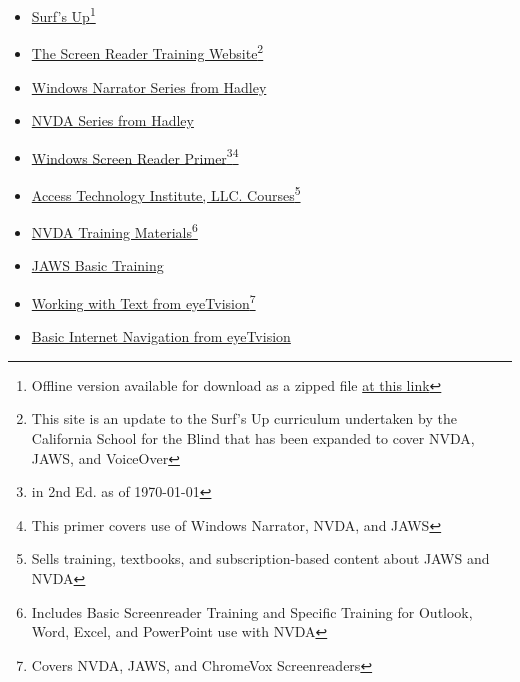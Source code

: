 \begin{itemize}[leftmargin=*]
	\item \href{https://www.freedomscientific.com/SurfsUp/}{Surf's Up}\footnote{\raggedright Offline version available for download as a zipped file \href{https://support.freedomscientific.com/SurfsUp/ZIP\_Surfs\_Up.zip}{at this link}}
	\item \href{https://srt.csb-cde.ca.gov/}{The Screen Reader Training Website}\footnote{\raggedright This site is an update to the Surf's Up curriculum undertaken by the California School for the Blind that has been expanded to cover NVDA, JAWS, and VoiceOver}
	\item \href{https://hadley.edu/workshops/windows-narrator-series}{Windows Narrator Series from Hadley}
	\item \href{https://hadley.edu/workshops/nvda-screen-reader-series}{NVDA Series from Hadley}
	\item \href{https://carroll.org/the-windows-screen-reader-primer-all-the-basics-and-more-second-edition/}{Windows Screen Reader Primer}\footnote{\raggedright in 2nd Ed. as of \today}\fnsep\footnote{\raggedright This primer covers use of Windows Narrator, NVDA, and JAWS}
	\item \href{https://www.blind.training/}{Access Technology Institute, LLC. Courses}\footnote{\raggedright Sells training, textbooks, and subscription-based content about JAWS and NVDA} 
	\item \href{https://www.nvaccess.org/product/nvda-productivity-bundle/}{NVDA Training Materials}\footnote{\raggedright Includes Basic Screenreader Training and Specific Training for Outlook, Word, Excel, and PowerPoint use with NVDA}
	\item \href{https://support.freedomscientific.com/Training/JAWS-Basic-Training.zip}{JAWS Basic Training}
	\item \href{https://eyetvision.org/screen-reader-curriculum-landing-page/\#wwt2}{Working with Text  from eyeTvision}\footnote{\raggedright Covers NVDA, JAWS, and ChromeVox Screenreaders} 
	\item \href{https://eyetvision.org/screen-reader-curriculum-landing-page/\#bin2}{Basic Internet Navigation from eyeTvision}\footnotemark[\value{footnote}]
\end{itemize}

